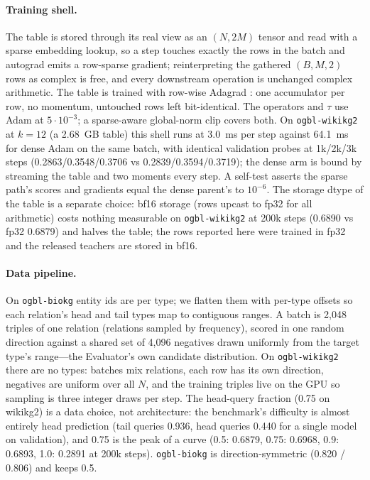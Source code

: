 \documentclass[11pt,a4paper]{article}
\begin{document}
\paragraph{Training shell.}
\label{sec:shell}
The table is stored through its real view as an $(N,2M)$ tensor and read
with a sparse embedding lookup, so a step touches exactly the rows in the
batch and autograd emits a row-sparse gradient; reinterpreting the
gathered $(B,M,2)$ rows as complex is free, and every downstream
operation is unchanged complex arithmetic. The table is trained with
row-wise Adagrad \citep{duchi2011adagrad,lerer2019pbg}: one accumulator
per row, no momentum, untouched rows left bit-identical. The operators
and $\tau$ use Adam \citep{kingma2015adam} at $5\cdot10^{-3}$; a
sparse-aware global-norm clip covers both. On \texttt{ogbl-wikikg2} at
$k=12$ (a 2.68~GB table) this shell runs at 3.0~ms per step against
64.1~ms for dense Adam on the same batch, with identical validation
probes at 1k/2k/3k steps (0.2863/0.3548/0.3706 vs
0.2839/0.3594/0.3719); the dense arm is bound by streaming the table and
two moments every step. A self-test asserts the sparse path's scores and
gradients equal the dense parent's to $10^{-6}$. The storage dtype of
the table is a separate choice: bf16 storage (rows upcast to fp32 for all
arithmetic) costs nothing measurable on \texttt{ogbl-wikikg2} at 200k
steps (0.6890 vs fp32 0.6879) and halves the table; the rows reported
here were trained in fp32 and the released teachers are stored in bf16.

\paragraph{Data pipeline.}
On \texttt{ogbl-biokg} entity ids are per type; we flatten them with
per-type offsets so each relation's head and tail types map to
contiguous ranges. A batch is 2{,}048 triples of one relation (relations
sampled by frequency), scored in one random direction against a shared
set of 4{,}096 negatives drawn uniformly from the target type's
range---the Evaluator's own candidate distribution. On
\texttt{ogbl-wikikg2} there are no types: batches mix relations, each row
has its own direction, negatives are uniform over all $N$, and the
training triples live on the GPU so sampling is three integer draws per
step. The head-query fraction (0.75 on wikikg2) is a data choice, not
architecture: the benchmark's difficulty is almost entirely head
prediction (tail queries 0.936, head queries 0.440 for a single model on
validation), and 0.75 is the peak of a curve
(0.5: 0.6879, 0.75: 0.6968, 0.9: 0.6893, 1.0: 0.2891 at 200k steps).
\texttt{ogbl-biokg} is direction-symmetric (0.820 / 0.806) and keeps 0.5.
\end{document}
